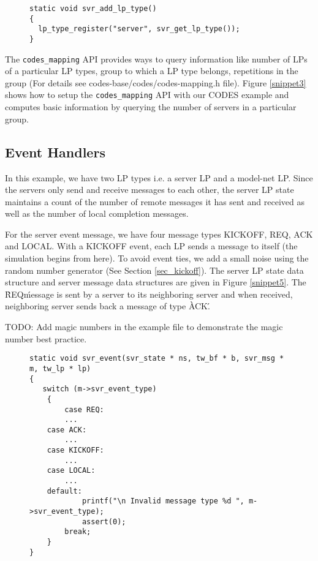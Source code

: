 \documentclass[conference,10pt,compsocconf,onecolumn]{IEEEtran}
\newcommand{\codesmapping}[1]{\texttt{codes\_mapping}}
\begin{document}
\begin{figure}
\begin{lstlisting}[caption=Registering an LP type, label=snippet4]
static void svr_add_lp_type()
{
  lp_type_register("server", svr_get_lp_type());
}
\end{lstlisting}
\end{figure}

The \codesmapping{} API provides ways to query information like number of LPs of
a particular LP types, group to which a LP type belongs, repetitions in the
group (For details see codes-base/codes/codes-mapping.h file).  Figure
\ref{snippet3} shows how to setup the \codesmapping{} API with our CODES example
and computes basic information by querying the number of servers in a particular
group. 

\subsection{Event Handlers}
In this example, we have two LP types i.e. a server LP and a model-net LP.
Since the servers only send and receive messages to each other, the server LP state
maintains a count of the number of remote messages it has sent and received as
well as the number of local completion messages.   

For the server event message, we have four message types KICKOFF, REQ, ACK and
LOCAL. With a KICKOFF event, each LP sends a message to itself (the simulation
begins from here).  To avoid event ties, we add a small noise using the random
number generator (See Section \ref{sec_kickoff}). The server LP state data structure
and server message data structures are given in Figure \ref{snippet5}. The \`REQ\'
message is sent by a server to its neighboring server and when received,
neighboring server sends back a message of type \`ACK\'.

TODO: Add magic numbers in the example file to demonstrate the magic number best
practice. 

\begin{figure}
\begin{lstlisting}[caption=Event handler of the server LP type., label=snippet5]
static void svr_event(svr_state * ns, tw_bf * b, svr_msg * m, tw_lp * lp)
{
   switch (m->svr_event_type)
    {
        case REQ:
        ...
	case ACK:
        ...
	case KICKOFF:
        ...
	case LOCAL:
        ...
	default:
            printf("\n Invalid message type %d ", m->svr_event_type);
            assert(0);
        break;
    }
}
\end{lstlisting}
\end{figure}
\end{document}
